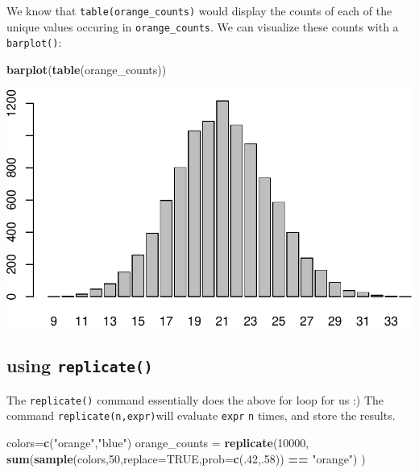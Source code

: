 \documentclass[
]{book}
\newenvironment{Shaded}{\begin{snugshade}}{\end{snugshade}}
\newcommand{\AttributeTok}[1]{\textcolor[rgb]{0.13,0.29,0.53}{#1}}
\newcommand{\ConstantTok}[1]{\textcolor[rgb]{0.56,0.35,0.01}{#1}}
\newcommand{\DecValTok}[1]{\textcolor[rgb]{0.00,0.00,0.81}{#1}}
\newcommand{\FunctionTok}[1]{\textcolor[rgb]{0.13,0.29,0.53}{\textbf{#1}}}
\newcommand{\NormalTok}[1]{#1}
\newcommand{\OtherTok}[1]{\textcolor[rgb]{0.56,0.35,0.01}{#1}}
\newcommand{\SpecialCharTok}[1]{\textcolor[rgb]{0.81,0.36,0.00}{\textbf{#1}}}
\newcommand{\StringTok}[1]{\textcolor[rgb]{0.31,0.60,0.02}{#1}}
\theoremstyle{definition}
\theoremstyle{definition}
\theoremstyle{definition}
\theoremstyle{definition}
\theoremstyle{remark}
\begin{document}
We know that \texttt{table(orange\_counts)} would display the counts of each of the unique values occuring in \texttt{orange\_counts}. We can visualize these counts with a \texttt{barplot()}:

\begin{Shaded}
\begin{Highlighting}[]
\FunctionTok{barplot}\NormalTok{(}\FunctionTok{table}\NormalTok{(orange\_counts))}
\end{Highlighting}
\end{Shaded}

\includegraphics{math340-notes_files/figure-latex/unnamed-chunk-90-1.pdf}

\subsection{\texorpdfstring{using \texttt{replicate()}}{using replicate()}}\label{using-replicate}

The \texttt{replicate()} command essentially does the above for loop for us :) The command \texttt{replicate(n,expr)}will evaluate \texttt{expr} \texttt{n} times, and store the results.

\begin{Shaded}
\begin{Highlighting}[]
\NormalTok{colors}\OtherTok{=}\FunctionTok{c}\NormalTok{(}\StringTok{"orange"}\NormalTok{,}\StringTok{"blue"}\NormalTok{)}
\NormalTok{orange\_counts }\OtherTok{=} 
  \FunctionTok{replicate}\NormalTok{(}\DecValTok{10000}\NormalTok{,}
            \FunctionTok{sum}\NormalTok{(}\FunctionTok{sample}\NormalTok{(colors,}\DecValTok{50}\NormalTok{,}\AttributeTok{replace=}\ConstantTok{TRUE}\NormalTok{,}\AttributeTok{prob=}\FunctionTok{c}\NormalTok{(.}\DecValTok{42}\NormalTok{,.}\DecValTok{58}\NormalTok{)) }\SpecialCharTok{==} \StringTok{"orange"}\NormalTok{)}
\NormalTok{            )}
\end{Highlighting}
\end{Shaded}
\end{document}
